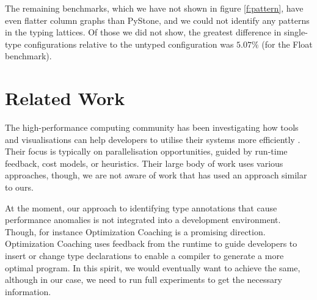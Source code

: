 \documentclass[sigplan,screen]{acmart}
\begin{document}
The remaining benchmarks, which we have not shown in figure \ref{f:pattern}, have even flatter column graphs than PyStone, and we could not identify any patterns in the typing lattices. Of those we did not show, the greatest difference in single-type configurations relative to the untyped configuration was $5.07\%$ (for the Float benchmark).


\section{Related Work}
\label{s-rel}

The high-performance computing community has been investigating how
tools and visualisations can help developers to utilise their systems
more efficiently \citep{Papenhausen:2016:IVT,daSilva:2019:PSV}.
Their focus is typically on parallelisation opportunities,
guided by run-time feedback, cost models, or heuristics. 
Their large body of work \citep{Isaacs:2014:PerfViz} uses various approaches,
though, we are not aware of work that has used an approach similar to ours.

At the moment, our approach to identifying type annotations that cause
performance anomalies is not integrated into a development environment.
Though, for instance Optimization Coaching
\citep{St-Amour:2012:OCO} is a promising direction.
Optimization Coaching uses feedback from the runtime to guide developers
to insert or change type declarations 
to enable a compiler to generate a more optimal program.
In this spirit, we would eventually want to achieve the same, although
in our case,
we need to run full experiments to get the necessary information.
\end{document}
